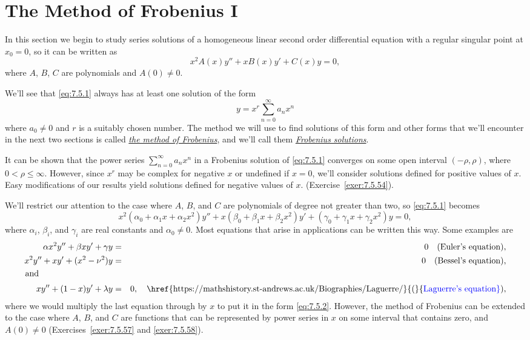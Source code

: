 \section{The Method of Frobenius I}

\noindent
In this section we begin to study series solutions of a homogeneous linear second order differential
equation with a regular singular point at $x_{0}=0$, so it can be written as
\begin{equation}
  \label{eq:7.5.1}x^{2}A(x)y''+xB(x)y'+C(x)y=0,
\end{equation}
where $A$, $B$, $C$ are polynomials and $A(0)\ne0$.

We'll see that \eqref{eq:7.5.1} always has at least one solution of the form
\[
  y=x^{r}\sum_{n=0}^{\infty}a_{n}x^{n}
\]
where $a_{0}\ne0$ and $r$ is a suitably chosen number. The method we will use to find solutions of
this form and other forms that we'll encounter in the next two sections is called
\href{https://mathshistory.st-andrews.ac.uk/Biographies/Frobenius/}{\color{blue}
\it the method of Frobenius}, and we'll call them
\href{https://mathshistory.st-andrews.ac.uk/Biographies/Frobenius/}{\it Frobenius solutions\/}.

It can be shown that the power series $\sum_{n=0}^{\infty}a_{n}x^{n}$ in a Frobenius solution of
\eqref{eq:7.5.1} converges on some open interval $(-\rho,\rho)$, where $0<\rho\le\infty$. However,
since $x^{r}$ may be complex for negative $x$ or undefined if $x=0$, we'll consider solutions
defined for positive values of $x$. Easy modifications of our results yield solutions defined for
negative values of $x$. (Exercise~\ref{exer:7.5.54}).

We'll restrict our attention to the case where $A$, $B$, and $C$ are polynomials of degree not
greater than two, so \eqref{eq:7.5.1} becomes
\begin{equation}
  \label{eq:7.5.2}x^{2}(\alpha_{0}+\alpha_{1}x+\alpha_{2}x^{2})y''+x(\beta_{0}+\beta_{1}x+\beta_{2}x^{2})y' +(\gamma_{0}+\gamma_{1}x+\gamma_{2}x^{2})y=0,
\end{equation}
where $\alpha_{i}$, $\beta_{i}$, and $\gamma_{i}$ are real constants and $\alpha_{0}\ne0$. Most
equations that arise in applications can be written this way. Some examples are
\begin{eqnarray*}
  \alpha x^{2}y''+\beta xy'+\gamma y & = & 0\mbox{\quad(Euler's equation)},   \\
  x^{2}y''+xy'+(x^{2}-\nu^{2})y      & = & 0\mbox{\quad (Bessel's equation)}, \\
  \arraytext{and}                                                             \\
  xy''+(1-x)y'+\lambda y             & = & 0,\mbox{\quad\href{https://mathshistory.st-andrews.ac.uk/Biographies/Laguerre/}{(}{\color{blue}Laguerre's equation})},
\end{eqnarray*}
where we would multiply the last equation through by $x$ to put it in the form \eqref{eq:7.5.2}.
However, the method of Frobenius can be extended to the case where $A$, $B$, and $C$ are functions
that can be represented by power series in $x$ on some interval that contains zero, and
$A(0)\ne0$ (Exercises~\ref{exer:7.5.57} and \ref{exer:7.5.58}).

